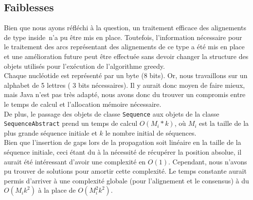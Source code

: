
\subsection{Faiblesses}

Bien que nous ayons réfléchi à la question, un traitement efficace des alignements de type \og inside\fg~n'a pu être mis en place. Toutefois, l'information nécessaire pour le traitement des arcs représentant des alignements de ce type a été mis en place et une amélioration future peut être effectuée sans devoir changer la structure des objets utilisés pour l'exécution de l'algorithme greedy.\\

Chaque nucléotide est représenté par un byte (8 bits). Or, nous travaillons sur un alphabet de 5 lettres ( 3 bits nécessaires). Il y aurait donc moyen de faire mieux, mais Java n'est pas très adapté, nous avons donc du trouver un compromis entre le temps de calcul et l'allocation mémoire nécessaire.\\

De plus, le passage des objets de classe \verb|Sequence| aux objets de la classe
\verb|SequenceAbstract| prend un temps de calcul $O(M_{i} * k)$, où $M_{i}$ est
la taille de la plus grande séquence initiale et $k$ le nombre initial de
séquences.\\

Bien que l'insertion de gaps lors de la propagation soit
linéaire en la taille de la séquence initiale, ceci étant du à la nécessité de
récupérer la position absolue, il aurait été intéressant d'avoir une complexité
en $O(1)$. Cependant, nous n'avons pu trouver de solutions pour amortir cette
complexité. Le temps constante aurait permis d'arriver à une complexité globale
(pour l'alignement et le consensus) à du $O(M_{i} k ^{2})$ à la place de
$O(M_{i}^{2} k^{2})$.\\

